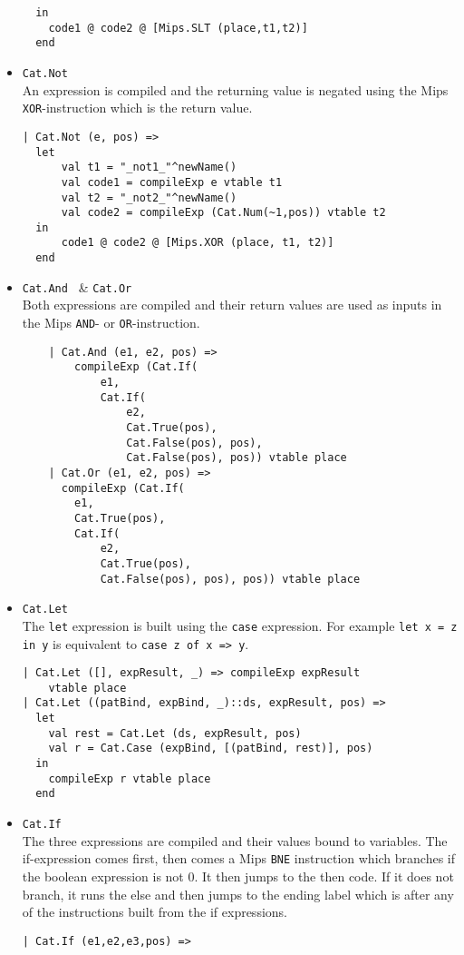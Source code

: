 \documentclass{article}
\begin{document}
\begin{itemize}
\begin{lstlisting}
  in
    code1 @ code2 @ [Mips.SLT (place,t1,t2)]
  end
	\end{lstlisting}
	\item {\tt Cat.Not } \\
	An expression is compiled and the returning value is negated using the Mips {\tt XOR}-instruction which is the return value.
	\begin{lstlisting}
| Cat.Not (e, pos) =>
  let
      val t1 = "_not1_"^newName()
      val code1 = compileExp e vtable t1
      val t2 = "_not2_"^newName()
      val code2 = compileExp (Cat.Num(~1,pos)) vtable t2
  in
      code1 @ code2 @ [Mips.XOR (place, t1, t2)]
  end
	\end{lstlisting}
	\item {\tt Cat.And } \& {\tt Cat.Or } \\
	Both expressions are compiled and their return values are used as inputs in the Mips {\tt AND}- or {\tt OR}-instruction.
	\begin{lstlisting}
    | Cat.And (e1, e2, pos) => 
		compileExp (Cat.If(
			e1, 
			Cat.If(
				e2, 
				Cat.True(pos), 
				Cat.False(pos), pos), 
				Cat.False(pos), pos)) vtable place
    | Cat.Or (e1, e2, pos) =>
      compileExp (Cat.If(
		e1, 
		Cat.True(pos), 
		Cat.If(
			e2, 
			Cat.True(pos), 
			Cat.False(pos), pos), pos)) vtable place
	\end{lstlisting}
	\item {\tt Cat.Let } \\
	The {\tt let} expression is built using the {\tt case} expression. For example {\tt let x = z in y} is equivalent to {\tt case z of x => y}.
	\begin{lstlisting}
| Cat.Let ([], expResult, _) => compileExp expResult 
	vtable place
| Cat.Let ((patBind, expBind, _)::ds, expResult, pos) =>
  let
    val rest = Cat.Let (ds, expResult, pos)
    val r = Cat.Case (expBind, [(patBind, rest)], pos)
  in
    compileExp r vtable place
  end
	\end{lstlisting}
	\item {\tt Cat.If } \\
	The three expressions are compiled and their values bound to variables. The if-expression comes first, then comes a Mips {\tt BNE} instruction which branches if the boolean expression is not $0$. It then jumps to the then code.
	If it does not branch, it runs the else and then jumps to the ending label which is after any of the instructions built from the if expressions.
	\begin{lstlisting}
| Cat.If (e1,e2,e3,pos) =>

\end{lstlisting}
\end{itemize}
\end{document}
